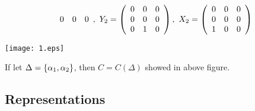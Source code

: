 \documentclass[a4paper,12pt]{article}
\begin{document}
\begin{exam}
\begin{enumerate}
\begin{equation*}
\begin{split}
{\begin{array}{ccc}
						0 & 0 & 0
					\end{array}
				},~Y_2 = \left(
					\begin{array}{ccc}
						0 & 0 & 0\\
						0 & 0 &  0 \\
						0 & 1 & 0
					\end{array}
					\right),~X_2 = \left(
					\begin{array}{ccc}
						0 & 0 & 0\\
						0 & 0 &  0 \\
						1 & 0 & 0
					\end{array}
					\right)
				\end{split}
			\end{equation*}
			\begin{center}
				\texttt{[image: 1.eps]}
			\end{center}
			If let $\Delta = \left\{\alpha_1,\alpha_2\right\}$, then $C = C(\Delta)$ showed in above figure.
		\end{enumerate}
	\end{exam}

	\subsection{Representations}
\end{document}
